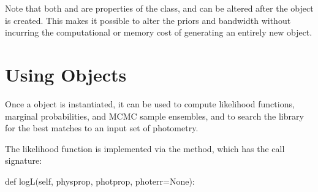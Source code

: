 \documentclass[letterpaper,10pt,english]{sphinxmanual}
\begin{document}
Note that both  and  are properties of the  class, and can be altered after the  object is created. This makes it possible to alter the priors and bandwidth without incurring the computational or memory cost of generating an entirely new  object.


\section{Using  Objects}
\label{\detokenize{bayesphot:using-bp-objects}}
Once a  object is instantiated, it can be used to compute likelihood functions, marginal probabilities, and MCMC sample ensembles, and to search the library for the best matches to an input set of photometry.

The likelihood function is implemented via the  method, which has the call signature:

\begin{sphinxVerbatim}[commandchars=\\\{\}]
def logL(self, physprop, photprop, photerr=None):
\end{sphinxVerbatim}
\end{document}
